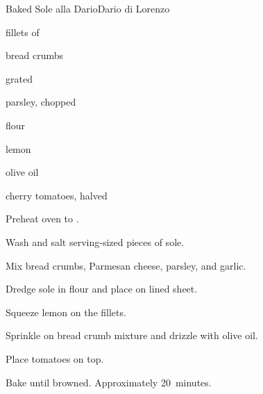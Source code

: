 \begin{recipe}{Baked Sole alla Dario}{Dario di Lorenzo}{}

\begin{ingredients}
\item fillets of 
\item bread crumbs
\item grated 
\item parsley, chopped
\item flour
\item lemon
\item olive oil
\item cherry tomatoes, halved
\end{ingredients}

\begin{directions}
\item Preheat oven to .
\item Wash and salt serving-sized pieces of sole.
\item Mix bread crumbs, Parmesan cheese, parsley, and garlic.
\item Dredge sole in flour and place on lined sheet.
\item Squeeze lemon on the fillets.
\item Sprinkle on bread crumb mixture and drizzle with olive oil.
\item Place tomatoes on top.
\item Bake until browned. Approximately 20~minutes.
\end{directions}

\end{recipe}
